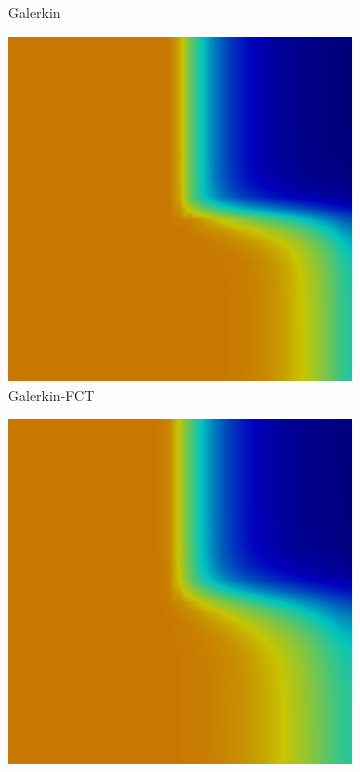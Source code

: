 \documentclass{beamer}
\begin{document}
\begin{frame}
\begin{figure}[h]
\begin{subfigure}{0.3\textwidth}
      \caption{Galerkin}
   \end{subfigure}
   \begin{subfigure}{0.3\textwidth}
      \includegraphics[width=\textwidth]{./figures/GalFCT.png}
      \caption{Galerkin-FCT}
   \end{subfigure}
   \begin{subfigure}{0.3\textwidth}
      \includegraphics[width=\textwidth]{./figures/low.png}

\end{subfigure}
\end{figure}
\end{frame}
\end{document}
